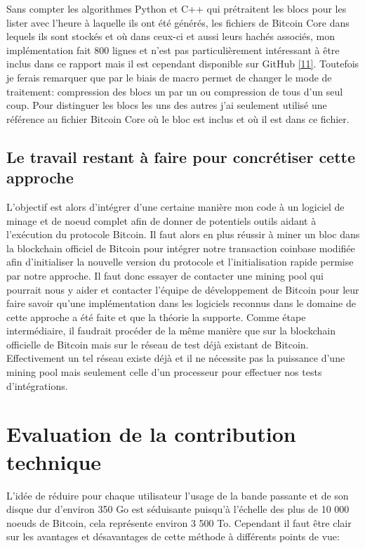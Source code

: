 \documentclass[12pt,a4paper]{article}
\newcommand{\source}[1]{\hyperlink{#1}{[#1]}}
\begin{document}
	Sans compter les algorithmes Python et C++ qui prétraitent les blocs pour les lister avec l'heure à laquelle ils ont été générés, les fichiers de Bitcoin Core dans lequels ils sont stockés et où dans ceux-ci et aussi leurs hachés associés, mon implémentation fait 800 lignes et n'est pas particulièrement intéressant à être inclus dans ce rapport mais il est cependant disponible sur GitHub \source{11}. Toutefois je ferais remarquer que par le biais de macro permet de changer le mode de traitement: compression des blocs un par un ou compression de tous d'un seul coup. Pour distinguer les blocs les uns des autres j'ai seulement utilisé une référence au fichier Bitcoin Core où le bloc est inclus et où il est dans ce fichier.
	
	\subsection{Le travail restant à faire pour concrétiser cette approche}
	
	L'objectif est alors d'intégrer d'une certaine manière mon code à un logiciel de minage et de noeud complet afin de donner de potentiels outils aidant à l'exécution du protocole Bitcoin. Il faut alors en plus réussir à miner un bloc dans la blockchain officiel de Bitcoin pour intégrer notre transaction coinbase modifiée afin d'initialiser la nouvelle version du protocole et l'initialisation rapide permise par notre approche. Il faut donc essayer de contacter une mining pool qui pourrait nous y aider et contacter l'équipe de développement de Bitcoin pour leur faire savoir qu'une implémentation dans les logiciels reconnus dans le domaine de cette approche a été faite et que la théorie la supporte. Comme étape intermédiaire, il faudrait procéder de la même manière que sur la blockchain officielle de Bitcoin mais sur le réseau de test déjà existant de Bitcoin. Effectivement un tel réseau existe déjà et il ne nécessite pas la puissance d'une mining pool mais seulement celle d'un processeur pour effectuer nos tests d'intégrations.\\
		
	\section{Evaluation de la contribution technique} %
	
	L'idée de réduire pour chaque utilisateur l'usage de la bande passante et de son disque dur d'environ 350 Go est séduisante puisqu'à l'échelle des plus de 10 000 noeuds de Bitcoin, cela représente environ 3 500 To. Cependant il faut être clair sur les avantages et désavantages de cette méthode à différents points de vue:
	
\end{document}
